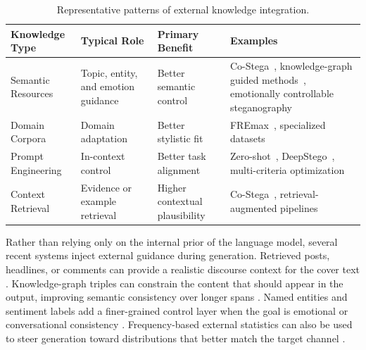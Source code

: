 \begin{table}[t]
  \centering
  \small
  \caption{Representative patterns of external knowledge integration.}
  \label{tab:knowledge_integration}
  \begin{tabular}{|>{\raggedright\arraybackslash}p{3cm}|>{\raggedright\arraybackslash}p{2.2cm}|>{\raggedright\arraybackslash}p{3cm}|>{\raggedright\arraybackslash}p{5.2cm}|}
    \hline
    \textbf{Knowledge Type} & \textbf{Typical Role}               & \textbf{Primary Benefit}       & \textbf{Examples}                                                                \\
    \hline
    Semantic Resources      & Topic, entity, and emotion guidance & Better semantic control        & Co-Stega~\cite{liao2024co}, knowledge-graph guided methods~\cite{li2024semantic,ding2023joint}, emotionally controllable steganography~\cite{shi2025emotionally} \\
    \hline
    Domain Corpora          & Domain adaptation                   & Better stylistic fit           & FREmax~\cite{pang2024fremax}, specialized datasets                                                     \\
    \hline
    Prompt Engineering      & In-context control                  & Better task alignment          & Zero-shot~\cite{lin2024zero}, DeepStego~\cite{kuznetsov2025deepstego}, multi-criteria optimization~\cite{wozniak2025multicriteria}                                \\
    \hline
    Context Retrieval       & Evidence or example retrieval       & Higher contextual plausibility & Co-Stega~\cite{liao2024co}, retrieval-augmented pipelines~\cite{wang2023hi}                                          \\
    \hline
  \end{tabular}
\end{table}

Rather than relying only on the internal prior of the language model, several recent systems inject external guidance during generation. Retrieved posts, headlines, or comments can provide a realistic discourse context for the cover text \cite{wang2023hi}. Knowledge-graph triples can constrain the content that should appear in the output, improving semantic consistency over longer spans \cite{li2024semantic}. Named entities and sentiment labels add a finer-grained control layer when the goal is emotional or conversational consistency \cite{shi2025emotionally}. Frequency-based external statistics can also be used to steer generation toward distributions that better match the target channel \cite{pang2024fremax}.

